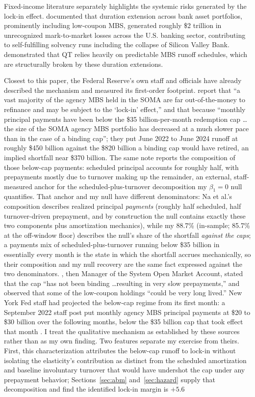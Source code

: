 \documentclass[12pt]{article}
\begin{document}
Fixed-income literature separately highlights the systemic risks generated by the lock-in effect. \citet{jiang2023} documented that duration extension across bank asset portfolios, prominently including low-coupon MBS, generated roughly \$2 trillion in unrecognized mark-to-market losses across the U.S. banking sector, contributing to self-fulfilling solvency runs including the collapse of Silicon Valley Bank. \citet{smith2023} demonstrated that QT relies heavily on predictable MBS runoff schedules, which are structurally broken by these duration extensions.

Closest to this paper, the Federal Reserve's own staff and officials have already described the mechanism and measured its first-order footprint. \citet{na2024} report that ``a vast majority of the agency MBS held in the SOMA are far out-of-the-money to refinance and may be subject to the `lock-in' effect,'' and that because ``monthly principal payments have been below the \$35 billion-per-month redemption cap \ldots the size of the SOMA agency MBS portfolio has decreased at a much slower pace than in the case of a binding cap''; they put June 2022 to June 2024 runoff at roughly \$450 billion against the \$820 billion a binding cap would have retired, an implied shortfall near \$370 billion. The same note reports the composition of those below-cap payments: scheduled principal accounts for roughly half, with prepayments mostly due to turnover making up the remainder, an external, staff-measured anchor for the scheduled-plus-turnover decomposition my $\beta_1 = 0$ null quantifies. That anchor and my null have different denominators: Na et al.'s composition describes realized principal \emph{payments} (roughly half scheduled, half turnover-driven prepayment, and by construction the null contains exactly these two components plus amortization mechanics), while my 88.7\% (in-sample; 85.7\% at the off-window floor) describes the null's share of the shortfall \emph{against the caps}; a payments mix of scheduled-plus-turnover running below \$35 billion in essentially every month is the state in which the shortfall accrues mechanically, so their composition and my null recovery are the same fact expressed against the two denominators. \citet{perli2024}, then Manager of the System Open Market Account, stated that the cap ``has not been binding \ldots resulting in very slow prepayments,'' and \citet{hammack2025} observed that some of the low-coupon holdings ``could be very long lived.'' New York Fed staff had projected the below-cap regime from its first month: a September 2022 staff post put monthly agency MBS principal payments at \$20 to \$30 billion over the following months, below the \$35 billion cap that took effect that month \citep{nyfed2022}. I treat the qualitative mechanism as established by these sources rather than as my own finding. Two features separate my exercise from theirs. First, this characterization attributes the below-cap runoff to lock-in without isolating the elasticity's contribution as distinct from the scheduled amortization and baseline involuntary turnover that would have undershot the cap under any prepayment behavior; Sections~\ref{sec:abm} and~\ref{sec:hazard} supply that decomposition and find the identified lock-in margin is $+5.6$ 
\end{document}
